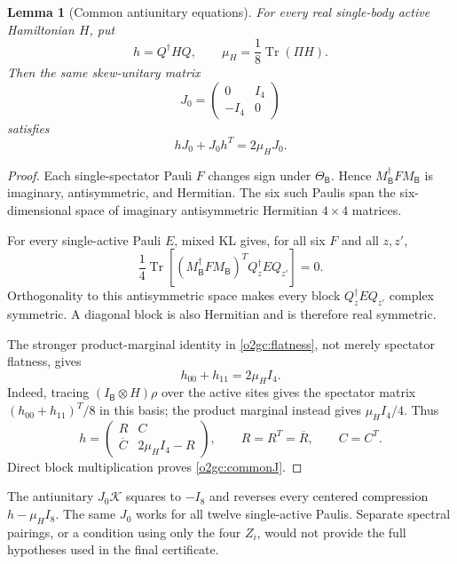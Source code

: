 \documentclass[11pt]{article}
\newtheorem{lemma}[theorem]{Lemma}
\theoremstyle{definition}
\begin{document}
\begin{lemma}[Common antiunitary equations]
\label{o2gc:lem-commonJ}
For every real single-body active Hamiltonian \(H\), put
\[
 h=Q^\dagger HQ,\qquad
 \mu_H=\frac18\operatorname{Tr}(\Pi H).
\]
Then the same skew-unitary matrix
\begin{equation}
 J_0=\begin{pmatrix}0&I_4\\-I_4&0\end{pmatrix}
 \label{o2gc:J0}
\end{equation}
satisfies
\begin{equation}
 hJ_0+J_0h^T=2\mu_HJ_0.
 \label{o2gc:commonJ}
\end{equation}
\end{lemma}

\begin{proof}
Each single-spectator Pauli \(F\) changes sign under
\(\Theta_{\mathsf B}\). Hence \(M_{\mathsf B}^\dagger F M_{\mathsf B}\)
is imaginary, antisymmetric, and Hermitian. The six such Paulis span
the six-dimensional space of imaginary antisymmetric Hermitian
\(4\times4\) matrices.

For every single-active Pauli \(E\), mixed KL gives, for all six \(F\)
and all \(z,z'\),
\[
 \frac14\operatorname{Tr}\!\left[
 (M_{\mathsf B}^\dagger F M_{\mathsf B})^T
 Q_z^\dagger E Q_{z'}\right]=0.
\]
Orthogonality to this antisymmetric space makes every block
\(Q_z^\dagger EQ_{z'}\) complex symmetric. A diagonal block is also
Hermitian and is therefore real symmetric.

The stronger product-marginal identity in \eqref{o2gc:flatness}, not
merely spectator flatness, gives
\[
 h_{00}+h_{11}=2\mu_HI_4.
\]
Indeed, tracing \((I_{\mathsf B}\otimes H)\rho\) over the active sites
gives the spectator matrix \((h_{00}+h_{11})^T/8\) in this basis;
the product marginal instead gives \(\mu_HI_4/4\).
Thus
\[
 h=\begin{pmatrix}
 R&C\\ \overline C&2\mu_HI_4-R
 \end{pmatrix},
 \qquad R=R^T=\overline R,\qquad C=C^T.
\]
Direct block multiplication proves \eqref{o2gc:commonJ}.
\end{proof}

The antiunitary \(J_0\mathcal K\) squares to \(-I_8\) and reverses
every centered compression \(h-\mu_HI_8\). The same \(J_0\) works for
all twelve single-active Paulis. Separate spectral pairings, or a
condition using only the four \(Z_i\), would not provide the full
hypotheses used in the final certificate.
\end{document}
